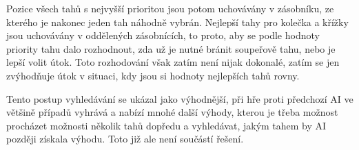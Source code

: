 \documentclass[a4paper,11pt,titlepage]{article}
\begin{document}
Pozice všech tahů s nejvyšší prioritou jsou potom uchovávány v zá\-sob\-níku, ze kterého je nakonec jeden tah náhodně vybrán. Nejlepší tahy pro kolečka a křížky jsou uchovávány v oddělených zásobnících, to proto, aby se podle hodnoty priority tahu dalo rozhodnout, zda už je nutné bránit soupeřově tahu, nebo je lepší volit útok. Toto rozhodování však zatím není nijak dokonalé, zatím se jen zvýhodňuje útok v situaci, kdy jsou si hodnoty nejlepších tahů rovny.

Tento postup vyhledávání se ukázal jako výhodnější, při hře proti před\-cho\-zí AI ve většině případů vyhrává a nabízí mnohé další výhody, kterou je třeba možnost procházet možnosti několik tahů dopředu a vyhledávat, jakým tahem by AI později získala výhodu. Toto již ale není součástí řešení.

\newpage

\end{document}
